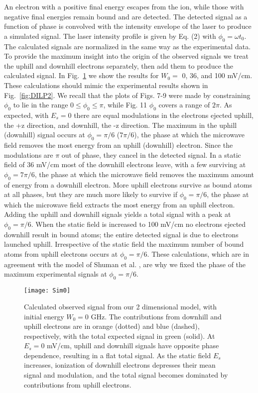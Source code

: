 \documentclass[aps,pra,preprint,groupedaddress]{revtex4-1}
\begin{document}
An electron with a positive final energy escapes from the ion, while those with negative final energies remain bound and are detected. The detected signal as a function of phase is convolved with the intensity envelope of the laser to produce a simulated signal. The laser intensity profile is given by Eq. (2) with $\phi_0=\omega t_0$. The calculated signals are normalized in the same way as the experimental data. To provide the maximum insight into the origin of the observed signals we treat the uphill and downhill electrons separately, then add them to produce the calculated signal.
In Fig.~\ref{fig:2DW0} we show the results for $W_0 =$ 0, 36, and 100 mV/cm. These calculations should mimic the experimental results shown in Fig.~\ref{fig:DILP2}. We recall that the plots of Figs. 7-9 were made by constraining $\phi_0$ to lie in the range $0\leq\phi_0\leq\pi$, while Fig. 11 $\phi_0$ covers a range of $2\pi$. As expected, with $E_s=0$ there are equal modulations in the electrons ejected uphill, the +z direction, and downhill, the -z direction. The maximum in the uphill (downhill) signal occurs at $\phi_0=\pi/6$ ($7\pi/6$), the phase at which the microwave field removes the most energy from an uphill (downhill) electron. Since the modulations are $\pi$ out of phase, they cancel in the detected signal. In a static field of 36 mV/cm most of the downhill electrons leave, with a few surviving at $\phi_0=7\pi/6$, the phase at which the microwave field removes the maximum amount of energy from a downhill electron. More uphill electrons survive as bound atoms at all phases, but they are much more likely to survive if $\phi_0=\pi/6$, the phase at which the microwave field extracts the most energy from an uphill electron. Adding the uphill and downhill signals yields a total signal with a peak at $\phi_0=\pi/6$. When the static field is increased to 100 mV/cm no electrons ejected downhill result in bound atoms; the entire detected signal is due to electrons launched uphill. Irrespective of the static field the maximum number of bound atoms from uphill electrons occurs at $\phi_0=\pi/6$. These calculations, which are in agreement with the model of Shuman et al. \cite{Shuman}, are why we fixed the phase of the maximum experimental signals at $\phi_0=\pi/6$.

\begin{figure}
	\texttt{[image: Sim0]}
	\caption{Calculated observed signal from our 2 dimensional model, with initial energy $W_0 = 0$ GHz. The contributions from downhill and uphill electrons are in orange (dotted) and blue (dashed), respectively, with the total expected signal in green (solid). At $E_s = 0$ mV/cm, uphill and downhill signals have opposite phase dependence, resulting in a flat total signal. As the static field $E_s$ increases, ionization of downhill electrons depresses their mean signal and modulation, and the total signal becomes dominated by contributions from uphill electrons.}
	\label{fig:2DW0}
\end{figure}
\end{document}
